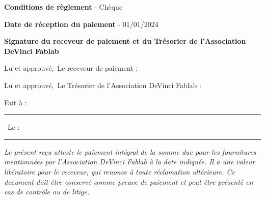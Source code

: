 \documentclass[11pt,a4paper]{article}
\begin{document}
\vspace{0.5cm}

\textbf{Conditions de règlement} - Chèque

\vspace{0.2cm}

\textbf{Date de réception du paiement} - 01/01/2024

\vspace{\fill}
\begin{framed}
    \begin{center}
        \textbf{Signature du receveur de paiement et du Trésorier de l'Association DeVinci Fablab}
    \end{center}

    \vspace{0.2cm}

    \begin{minipage}[t]{0.45\textwidth}
        \begin{flushleft}
            Lu et approuvé,\
            Le receveur de paiement :\
            \vspace{1.5cm}
        \end{flushleft}
    \end{minipage}\hfill
    \vrule width 0.75pt\hfill
    \begin{minipage}[t]{0.45\textwidth}
        \begin{flushright}
            Lu et approuvé,\
            Le Trésorier de l'Association DeVinci Fablab :\
            \vspace{1.5cm}
        \end{flushright}
    \end{minipage}

    \vspace{0.5cm}
    \begin{center}
        Fait à : \rule{3cm}{0.75pt} \
        Le : \rule{3cm}{0.75pt}
    \end{center}
\end{framed}



\vspace{0.5cm}
\textit{\footnotesize Le présent reçu atteste le paiement intégral de la somme due pour les fournitures mentionnées par l'Association DeVinci Fablab à la date indiquée. Il a une valeur libératoire pour le receveur, qui renonce à toute réclamation ultérieure. Ce document doit être conservé comme preuve de paiement et peut être présenté en cas de contrôle ou de litige. }
\end{document}
